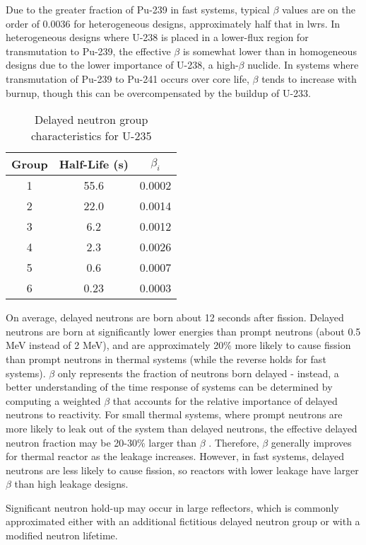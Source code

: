 Due to the greater fraction of Pu-239 in fast systems, typical \(\beta\) values are on the order of 0.0036 for heterogeneous designs, approximately half that in \glspl{lwr}. In heterogeneous designs where U-238 is placed in a lower-flux region for transmutation to Pu-239, the effective \(\beta\) is somewhat lower than in homogeneous designs due to the lower importance of U-238, a high-\(\beta\) nuclide. In systems where transmutation of Pu-239 to Pu-241 occurs over core life, \(\beta\) tends to increase with burnup, though this can be overcompensated by the buildup of U-233.

\begin{table}[h]
\caption{Delayed neutron group characteristics for U-235 \cite{duderstadt}}
\centering
\begin{tabular}{c |c c}
\hline\hline
 Group & Half-Life (s) & \(\beta_i\) \\ [0.5ex]
\hline 
1 & 55.6 & 0.0002 \\
2 & 22.0 & 0.0014 \\
3 & 6.2  & 0.0012 \\
4 & 2.3  & 0.0026 \\
5 & 0.6  & 0.0007 \\
6 & 0.23 & 0.0003 \\
\hline
\end{tabular}
\label{tab:U235_kinetics}
\end{table}

On average, delayed neutrons are born about 12 seconds after fission. Delayed neutrons are born at significantly lower energies than prompt neutrons (about 0.5 MeV instead of 2 MeV), and are approximately 20\% more likely to cause fission than prompt neutrons in thermal systems (while the reverse holds for fast systems). \(\beta\) only represents the fraction of neutrons born delayed - instead, a better understanding of the time response of systems can be determined by computing a weighted \(\beta\) that accounts for the relative importance of delayed neutrons to reactivity. For small thermal systems, where prompt neutrons are more likely to leak out of the system than delayed neutrons, the effective delayed neutron fraction may be 20-30\% larger than \(\beta\) \cite{duderstadt}. Therefore, \(\beta\) generally improves for thermal reactor as the leakage increases. However, in fast systems, delayed neutrons are less likely to cause fission, so reactors with lower leakage have larger \(\beta\) than high leakage designs. 

Significant neutron hold-up may occur in large reflectors, which is commonly approximated either with an additional fictitious delayed neutron group \cite{xin_wang_thesis} or with a modified neutron lifetime.

